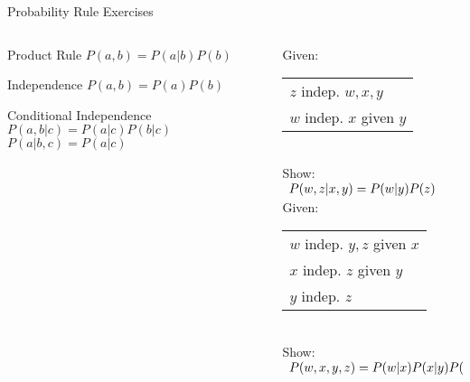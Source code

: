 \documentclass[14pt]{beamer}
\begin{document}
\begin{frame}{Probability Rule Exercises}
	\begin{columns}
		\begin{column}{0.47\textwidth}
			\begin{block}{Product Rule}
				$P(a,b) = P(a|b)P(b)$
			\end{block}
			\begin{block}{Independence}
				$P(a,b) = P(a)P(b)$
			\end{block}
			\begin{block}{Conditional Independence}
				$P(a,b|c) = P(a|c)P(b|c)$ \\
				$P(a|b,c) = P(a|c)$ \\
			\end{block}
		\end{column}
		\begin{column}{0.5\textwidth}
			\small
			Given: \\
			\begin{tabular}[t]{l}
				$z$ indep. $w,x,y$ \\
				$w$ indep. $x$ given $y$
			\end{tabular}
			\\ \smallskip
			Show:
			\\ \smallskip
			$
			\begin{array}{l@{}}
				P(w,z|x,y) = P(w|y)P(z)
			\end{array}
			$
			\\ \bigskip
			Given: \\
			\begin{tabular}[t]{l}
				$w$ indep. $y,z$ given $x$ \\
				$x$ indep. $z$ given $y$ \\
				$y$ indep. $z$
			\end{tabular}
			\\ \smallskip
			Show:
			\\ \smallskip
			\footnotesize
			$
			\begin{array}{l@{}}
				P(w,x,y,z) = P(w|x)P(x|y)P(y)P(z)
			\end{array}
			$
		\end{column}
	\end{columns}
\end{frame}
\end{document}
